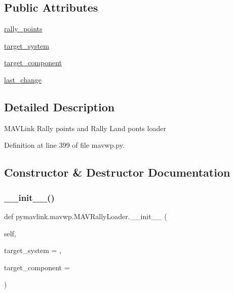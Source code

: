 \subsection*{Public Attributes}
\begin{DoxyCompactItemize}
\item 
\mbox{\hyperlink{classpymavlink_1_1mavwp_1_1MAVRallyLoader_a6d0257a0bbbf63a02933bbedeb8ba614}{rally\+\_\+points}}
\item 
\mbox{\hyperlink{classpymavlink_1_1mavwp_1_1MAVRallyLoader_a48808a91e7229e6cf1825dadf630b59f}{target\+\_\+system}}
\item 
\mbox{\hyperlink{classpymavlink_1_1mavwp_1_1MAVRallyLoader_af0fd1de971ba030f24d897219f4094cb}{target\+\_\+component}}
\item 
\mbox{\hyperlink{classpymavlink_1_1mavwp_1_1MAVRallyLoader_a53cd4202f793f51f8f7cb23ee72920c2}{last\+\_\+change}}
\end{DoxyCompactItemize}


\subsection{Detailed Description}
\begin{DoxyVerb}MAVLink Rally points and Rally Land ponts loader\end{DoxyVerb}
 

Definition at line 399 of file mavwp.\+py.



\subsection{Constructor \& Destructor Documentation}
\mbox{\label{classpymavlink_1_1mavwp_1_1MAVRallyLoader_a566bf2ce40fb10c41cbe6265ca84671b}} 
\subsubsection{\texorpdfstring{\_\_init\_\_()}{\_\_init\_\_()}}
{\footnotesize\ttfamily def pymavlink.\+mavwp.\+M\+A\+V\+Rally\+Loader.\+\_\+\+\_\+init\+\_\+\+\_\+ (\begin{DoxyParamCaption}\item[{}]{self,  }\item[{}]{target\+\_\+system = {},  }\item[{}]{target\+\_\+component = {} }\end{DoxyParamCaption})}



